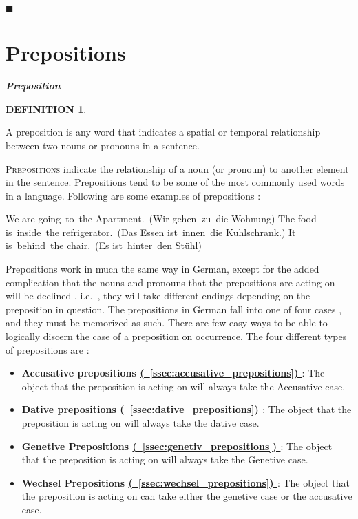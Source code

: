 \documentclass[a4paper,twocolumn,10pt]{article}
\newtheorem{mydef}{DEFINITION}[section]
\newcommand{\newpar}
{\par \vspace{0.3cm}}
\newcommand{\sectionend}
{
\nolinenumbers
\begin{center}
	$\blacksquare$
\end{center}
\clearpage
\linenumbers
}
\newcommand{\subsectionend}
{
\nolinenumbers
\linenumbers
}
\newcommand{\tcolorboxstart}
{
	\nolinenumbers
	\vspace{0.2cm}
	\centering
}
\newcommand{\tcolorboxend}
{
	\justifying
	\vspace{0.2cm}
	\linenumbers
}
\newcommand{\tcolorboxdefinition}[3]
{

\tcolorboxstart
\begin{defn-bg}

	\begin{defn-title}[width=7cm]{}
	{
		\normalsize \textbf{\textit{#1}}
	}
	\end{defn-title}

	\begin{defn-theword}
	{
		\footnotesize
		\begin{mydef} #2
		\end{mydef}
	}
	\end{defn-theword}


	\begin{defn-content}

	\justify
	#3

	\end{defn-content}

\end{defn-bg}
\tcolorboxend
}
\newcommand{\refssec}[1]
{
	\hyperref[sec:#1]
	{
		(\textsection~\ref{ssec:#1})
	}
}
\begin{document}

\subsectionend

\sectionend

\section{{Prepositions}}
\label{sec:prepositions}



\tcolorboxdefinition
{Preposition}
{\label{def:preposition}}
{
A preposition is any word that indicates a spatial or temporal relationship
between two nouns or pronouns in a sentence.

}


\lettrine[lines=3, findent=3pt, nindent=0pt]{P}{repositions} indicate the
relationship of a noun (or pronoun) to another element in the sentence.
Prepositions tend to be some of the most commonly used words in a language.
Following are some examples of prepositions :\newpar


We are going to the Apartment. (Wir gehen zu die Wohnung)
The food is inside the refrigerator. (Das Essen ist innen die Kuhlschrank.)
It is behind the chair. (Es ist hinter den Stühl)


Prepositions work in much the same way in German, except for the added
complication that the nouns and pronouns that the prepositions are acting on
will be declined , i.e.\ , they will take different endings depending on the
preposition in question. The prepositions in German fall into one of four cases
, and they must be memorized as such. There are few easy ways to be able to
logically discern the case of a preposition on occurrence. The four different
types of prepositions are :\newpar


\begin{itemize}[noitemsep]

	\item \textbf{Accusative prepositions \refssec{accusative_prepositions}} :
		The object that the preposition is acting on will always take the
		Accusative case.

	\item \textbf{Dative prepositions \refssec{dative_prepositions}} : The
		object that the preposition is acting on will always take the dative
		case.

	\item \textbf{Genetive Prepositions \refssec{genetiv_prepositions}} : The
		object that the preposition is acting on will always take the Genetive
		case.

	\item \textbf{Wechsel Prepositions \refssec{wechsel_prepositions}}  : The
		object that the preposition is acting on can take either the genetive
		case or the accusative case.

\end{itemize}
\end{document}
